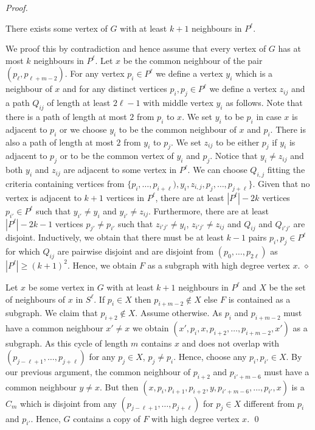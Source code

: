 \documentclass[runningheads,envcountsame]{llncs}
\newcommand{\forbiddenGraph}{F}
\newenvironment{claimproof}
{\noindent {\em Proof of Claim:} }
{\hfill $\diamond$ \smallskip}
\begin{document}
\begin{proof}
    \begin{mclaim}
        There exists some vertex of $G$ with at least $k+1$ neighbours in $P^\ell$.
    \end{mclaim}
    \begin{claimproof}
        We proof this by contradiction and hence assume that every vertex of $G$ has at most $k$ neighbours in $P^\ell$.
        Let $x$ be the common neighbour of the pair $(p_{\ell}, p_{\ell+m-2})$. For any vertex $p_i\in P^\ell$ we define a vertex $y_i$ which is a neighbour of $x$ and for any distinct vertices  $p_i,p_j \in P^{\ell}$ we define a vertex  $z_{ij}$ and a path $Q_{ij}$ of length at least $2\ell-1$ with middle vertex $y_i$  as follows.  Note that there  is a path of length at most $2$ from $p_i$ to $x$. We set $y_i$ to be $p_i$ in case $x$ is adjacent to $p_i$ or we choose $y_i$ to be the common neighbour of $x$ and $p_i$.  There is also a path of length at most $2$ from $y_i$ to $p_j$. We set $z_{ij}$ to be either $p_j$ if $y_i$ is adjacent to $p_j$ or to be the common vertex of $y_i$ and $p_j$. Notice that $y_i\not=z_{ij}$ and both $y_i$ and $z_{ij}$ are adjacent to some vertex in $P^{\ell}$. We can choose $Q_{i,j}$ fitting the criteria containing vertices from $\{p_{i},\dots, p_{i+\ell}), y_i,z_{i,j},p_j,\dots, p_{j+\ell}\}$. Given that no vertex is adjacent to $k+1$ vertices in $P^{\ell}$, there are at least $| P^{\ell} |-2k$ vertices $p_{i'}\in P^\ell$ such that $y_{i'} \neq y_i$ and $y_{i'} \neq z_{ij}$. Furthermore, there are at least $| P^{\ell} |-2k-1$ vertices $p_{j'}\not=p_{i'}$ such that $z_{i'j'} \neq y_i$, $z_{i'j'} \neq z_{ij}$ and $Q_{ij}$ and $Q_{i'j'}$ are disjoint. 
        Inductively, we obtain that there must be at least $k-1$ pairs $p_i,p_j\in P^\ell$ for which $Q_{ij}$ are pairwise disjoint and are disjoint from $(p_0,\dots, p_{2\ell})$ as $|P^\ell|\geq (k+1)^2$. Hence, we obtain $\forbiddenGraph$ as a subgraph with high degree vertex $x$.   
    \end{claimproof}

Let $x$ be some vertex in $G$ with at least $k+1$ neighbours in $P^\ell$ and $X$ be the set of neighbours of $x$ in $S^\ell$. If $p_i \in X$ then $p_{i+m-2} \notin X$ else $\forbiddenGraph$ is contained as a subgraph. We claim that $p_{i+2} \notin X$. Assume otherwise. As $p_i$ and $p_{i+m-2}$ must have a common neighbour $x' \neq x$ we obtain $(x',p_{i},x,p_{i+2},\dots, p_{i+m-2},x')$ as a subgraph. As this cycle of length $m$ contains $x$ and does not overlap with $(p_{j-\ell+1},\dots, p_{j+\ell})$ for any $p_j\in X$, $p_j\not=p_i$. Hence, choose any $p_i,p_{i'} \in X$. By our previous argument, the common neighbour of $p_{i+2}$ and $p_{i'+m-6}$ must have a common neighbour $y\not=x$. But then $(x,p_i,p_{i+1},p_{i+2},y,p_{i'+m-6},\dots, p_{i'},x)$ is a $C_m$ which is disjoint from any $(p_{j-\ell+1},\dots,p_{j+\ell})$ for $p_j\in X$ different from $p_i$ and $p_{i'}$. Hence, $G$ contains a copy of $\forbiddenGraph$ with high degree vertex $x$. \qed
\end{proof}
\end{document}
